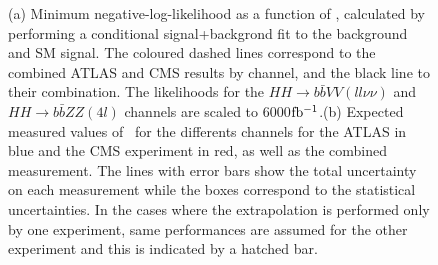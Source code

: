 




\begin{figure}[!htb]
\centering 
{} 
\caption{(a) Minimum negative-log-likelihood as a function of \kl, calculated by performing a conditional signal+backgrond fit to the background and SM signal. The coloured dashed lines correspond to the combined ATLAS and CMS results by channel, and the black line to their combination. The likelihoods for the $HH \rightarrow b\bar{b}VV(ll\nu\nu)$ and $HH \rightarrow b\bar{b}ZZ(4l)$ channels are scaled to 6000$\mbox{fb$^{-1}$}$.(b) Expected measured values of \kl\ for the differents channels for the ATLAS in blue and the CMS experiment in red, as well as the combined measurement. The lines with error bars show the total uncertainty on each measurement while the boxes correspond to the statistical uncertainties. In the cases where the extrapolation is performed only by one experiment, same performances are assumed for the other experiment and this is indicated by a hatched bar.} 
\label{fig:comb_HH} 
\end{figure}


